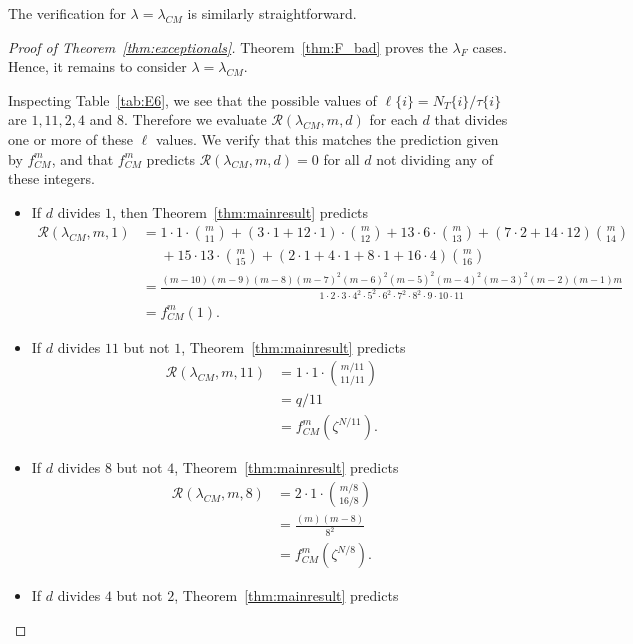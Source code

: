 \documentclass[12pt]{amsart}
\theoremstyle{definition}
\theoremstyle{remark}
\numberwithin{equation}{section}
\begin{document}
The verification for $\lambda = \lambda_{CM}$ is similarly straightforward. 

\begin{proof}[Proof of Theorem~\ref{thm:exceptionals}]
Theorem~\ref{thm:F_bad} proves the $\lambda_F$ cases. Hence, it remains to consider $\lambda = \lambda_{CM}$.

Inspecting Table~\ref{tab:E6}, we see that the possible values of $\ell\{i\} = N_T\{i\}/\tau\{i\}$ are $1,11,2,4$ and $8$. Therefore we evaluate $\mathcal{R}(\lambda_{CM},m,d)$ for each $d$ that divides one or more of these $\ell$ values. We verify that this matches the prediction given by $f^m_{CM}$, and that $f^m_{CM}$ predicts $\mathcal{R}(\lambda_{CM},m,d) = 0$ for all $d$ not dividing any of these integers.
\begin{itemize}
\item If $d$ divides $1$, then Theorem~\ref{thm:mainresult} predicts 
\begin{align*}
\mathcal{R}(\lambda_{CM},m,1) &= 1 \cdot 1 \cdot \binom{m}{11} + (3 \cdot 1  + 12 \cdot 1)  \cdot \binom{m}{12} + 13 \cdot 6 \cdot \binom{m}{13} + (7\cdot 2 + 14 \cdot 12) \binom{m}{14}  \\ &\ \ \ \ \ \ + 15 \cdot 13 \cdot \binom{m}{15} + (2 \cdot 1 + 4 \cdot 1 + 8 \cdot 1 + 16 \cdot 4) \binom{m}{16} \\
&= \frac{(m-10)(m-9)(m-8)(m-7)^2(m-6)^2(m-5)^2(m-4)^2(m-3)^2(m-2)(m-1)m}{1\cdot 2\cdot 3\cdot 4^2 \cdot 5^2 \cdot 6^2 \cdot 7^2 \cdot 8^2 \cdot 9 \cdot 10 \cdot 11} \\
&= f_{CM}^m(1).
\end{align*}
\item If $d$ divides $11$ but not $1$, Theorem~\ref{thm:mainresult} predicts
\begin{align*}
\mathcal{R}(\lambda_{CM},m,11) &= 1 \cdot 1 \cdot \binom{m/11}{11/11} \\
&= q/11 \\ 
&= f_{CM}^m(\zeta^{N/11}).
\end{align*}
\item If $d$ divides $8$ but not $4$, Theorem~\ref{thm:mainresult} predicts
\begin{align*}
\mathcal{R}(\lambda_{CM},m,8) &= 2 \cdot 1 \cdot \binom{m/8}{16/8} \\
&= \frac{(m)(m-8)}{8^2} \\
&= f_{CM}^m(\zeta^{N/8}).
\end{align*}
\item If $d$ divides $4$ but not $2$, Theorem~\ref{thm:mainresult} predicts

\end{itemize}
\end{proof}
\end{document}
